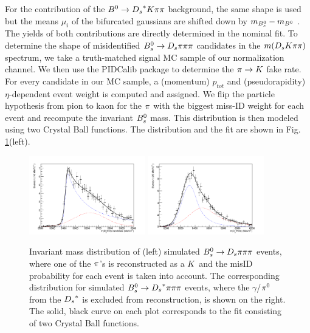 For the contribution of the ${{B}^0}\rightarrow{\ensuremath{{D}_{s}}}^{*}{K}{\pi}{\pi}$ background, the same shape is used but the means $\mu_{i}$ of the bifurcated gaussians are shifted down by $m_{{{B}^0_{s}}} - m_{{{B}^0}}$ \cite{Agashe:2014kda}. 
The yields of both contributions are directly determined in the nominal fit. \newline
To determine the shape of misidentified ${{B}^0_{s}}\rightarrow{\ensuremath{{D}_{s}}}{\ensuremath{\pi}}{\ensuremath{\pi}}{\ensuremath{\pi}}$ candidates in the $m({{D}_{s}}{K}{\pi}{\pi})$ spectrum, we take a truth-matched signal MC sample of our normalization channel. 
We then use the PIDCalib package to determine the ${\pi}\rightarrow{\ensuremath{K}}$ fake rate. For every candidate in our MC sample, a (momentum) $p_{tot}$ and (pseudorapidity) $\eta$-dependent event weight is computed and assigned. 
We flip the particle hypothesis from pion to kaon for the ${\pi}$ with the biggest miss-ID weight for each event and recompute the invariant ${{B}^0_{s}}$ mass. This distribution is then modeled using two Crystal Ball functions. 
The distribution and the fit are shown in Fig. \ref{fig: BsDspipipiMCmissID}(left). 

\begin{figure}[h]
\includegraphics[height=6.cm,width=0.45\textwidth]{figs/Bs2Dspipipi_as_DsKpipi.pdf}
\includegraphics[height=6.cm,width=0.45\textwidth]{figs/Bs2Dsstarpipipi_as_DsKpipi.pdf}
\caption{Invariant mass distribution of (left) simulated ${{B}^0_{s}}\rightarrow{\ensuremath{{D}_{s}}}{\ensuremath{\pi}}{\ensuremath{\pi}}{\ensuremath{\pi}}$ events, where one of the ${\pi}$'s is reconstructed as a ${K}$ and the misID probability for each event is taken into account. 
The corresponding distribution for simulated ${{B}^0_{s}}\rightarrow{\ensuremath{{D}_{s}}}^{*}{\pi}{\pi}{\pi}$ events, where the $\gamma$/${{\pi}^0}$ from the ${{D}_{s}}^{*}$ is excluded from reconstruction, is shown on the right.
The solid, black curve on each plot corresponds to the fit consisting of two Crystal Ball functions.}
\label{fig: BsDspipipiMCmissID}
\end{figure}
 
